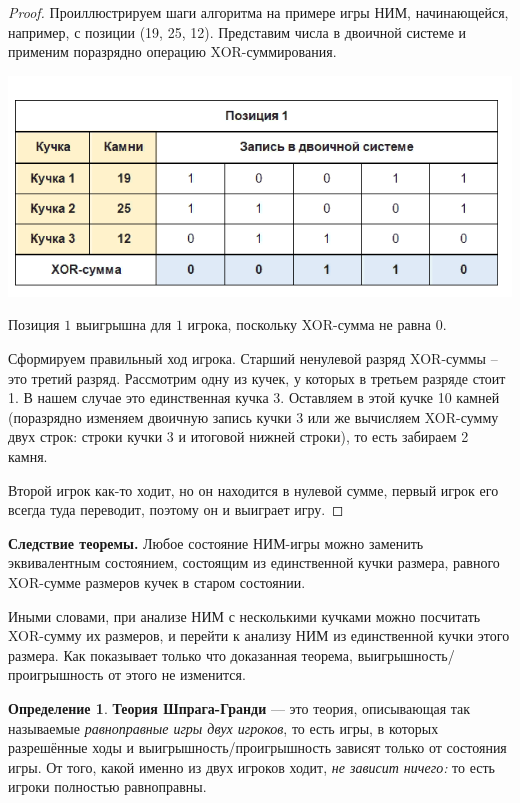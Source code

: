 \documentclass[aps,%
12pt,%
final,%
oneside,
onecolumn,%
musixtex, %
superscriptaddress,%
centertags]{article} %
\theoremstyle{plain}
\theoremstyle{definition}
\newtheorem{definition}{Определение}[subsection]
\theoremstyle{remark}
\begin{document}
\begin{proof}
Проиллюстрируем шаги алгоритма на примере игры НИМ, начинающейся, например, с позиции (19, 25, 12). Представим числа в двоичной системе и применим поразрядно операцию XOR-суммирования.
\begin{center}
  \includegraphics[scale=0.6]{images/13.png}
\end{center}

Позиция $1$ выигрышна для $1$ игрока, поскольку \textsc{XOR}-сумма не равна $0$. 

Сформируем правильный ход игрока. Старший ненулевой разряд XOR-суммы – это третий разряд. Рассмотрим одну из кучек, у которых в третьем разряде стоит 1. В нашем случае это единственная кучка 3. Оставляем в этой кучке 10 камней (поразрядно изменяем двоичную запись кучки 3 или же вычисляем XOR-сумму двух строк: строки кучки 3 и итоговой нижней строки), то есть забираем 2 камня.

Второй игрок как-то ходит, но он находится в нулевой сумме, первый игрок его всегда туда переводит, поэтому он и выиграет игру.

\end{proof}

\textbf{Следствие теоремы.} Любое состояние НИМ-игры можно заменить эквивалентным состоянием, состоящим из единственной кучки размера, равного XOR-сумме размеров кучек в старом состоянии.

Иными словами, при анализе НИМ с несколькими кучками можно посчитать XOR-сумму их размеров, и перейти к анализу НИМ из единственной кучки этого размера. Как показывает только что доказанная теорема, выигрышность/проигрышность от этого не изменится.

\begin{definition}
  \textbf{Теория Шпрага-Гранди} — это теория, описывающая так называемые \textit{равноправные игры двух игроков}, то есть игры, в которых разрешённые ходы и выигрышность/проигрышность зависят только от состояния игры. От того, какой именно из двух игроков ходит, \textit{не зависит ничего:} то есть игроки полностью равноправны.
\end{definition}
\end{document}
